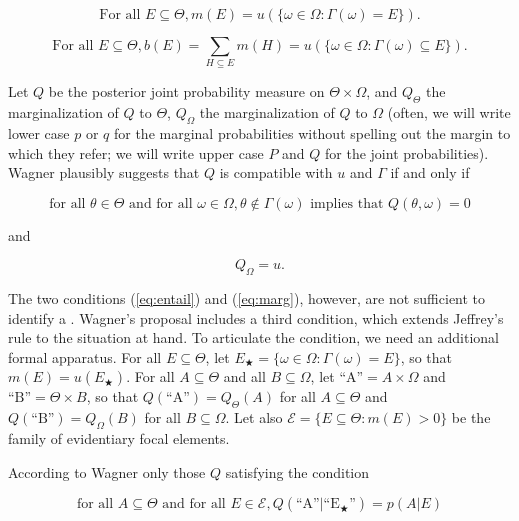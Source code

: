\documentclass[11pt]{article}
\begin{document}
\begin{equation}
  \mbox{For all }E\subseteq{}\Theta, m(E)=u(\{\omega\in\Omega:\Gamma(\omega)=E\})\label{eq:mof}.
\end{equation}

\begin{equation}
  \mbox{For all }E\subseteq{}\Theta, b(E)=\sum_{H\subseteq{}E}m(H)=u(\{\omega\in\Omega:\Gamma(\omega)\subseteq{}E\})\label{eq:bof}.
\end{equation}

Let $Q$ be the posterior joint probability measure on
$\Theta\times\Omega$, and $Q_{\Theta}$ the marginalization of $Q$ to
$\Theta$, $Q_{\Omega}$ the marginalization of $Q$ to $\Omega$ (often,
we will write lower case $p$ or $q$ for the marginal probabilities
without spelling out the margin to which they refer; we will write
upper case $P$ and $Q$ for the joint probabilities). Wagner plausibly
suggests that $Q$ is compatible with $u$ and $\Gamma$ if and only if

\begin{equation}
  \label{eq:entail}
  \mbox{for all }\theta\in\Theta\mbox{ and for all
  }\omega\in\Omega,\theta\notin\Gamma(\omega)\mbox{ implies that }Q(\theta,\omega)=0
\end{equation}

and

\begin{equation}
  \label{eq:marg}
  Q_{\Omega}=u.
\end{equation}

The two conditions (\ref{eq:entail}) and (\ref{eq:marg}), however, are
not sufficient to identify a  . Wagner's proposal includes a third
condition, which extends Jeffrey's rule to the situation at hand. To
articulate the condition, we need an additional formal apparatus. For
all $E\subseteq{}\Theta$, let
$E_{\bigstar}=\{\omega\in\Omega:\Gamma(\omega)=E\}$, so that
$m(E)=u(E_{\bigstar})$. For all $A\subseteq\Theta$ and all
$B\subseteq\Omega$, let $\mbox{``A''}=A\times\Omega$ and
$\mbox{``B''}=\Theta\times{}B$, so that
$Q(\mbox{``A''})=Q_{\Theta}(A)$ for all $A\subseteq\Theta$ and
$Q(\mbox{``B''})=Q_{\Omega}(B)$ for all $B\subseteq\Omega$. Let also
$\mathcal{E}=\{E\subseteq\Theta:m(E)>0\}$ be the family of evidentiary
focal elements.

According to Wagner only those $Q$ satisfying the condition

\begin{equation}
  \label{eq:wagn}
  \mbox{for all }A\subseteq\Theta\mbox{ and for all }E\in\mathcal{E},Q(\mbox{``A''}|\mbox{``E$_{\bigstar}$''})=p(A|E)
\end{equation}
\end{document}
